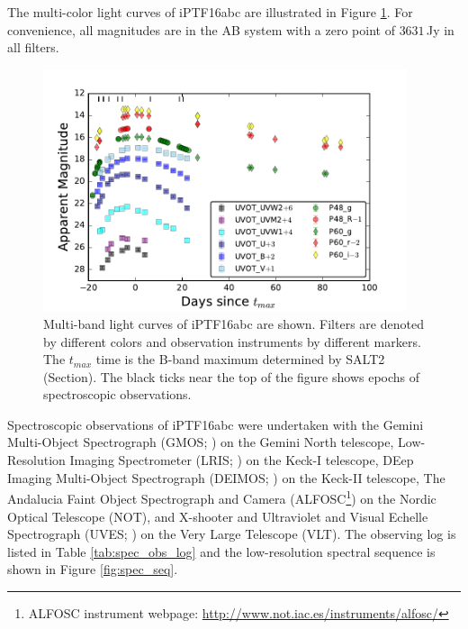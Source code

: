 \documentclass[twocolumn]{aastex61}
\begin{document}
The multi-color light curves of iPTF16abc are illustrated in Figure
\ref{fig:lightcurve}.  For convenience, all magnitudes are in the AB
system with a zero point of $3631$\,Jy in all filters.

\begin{figure}[htb]
  \centering
  \includegraphics[width=0.95\textwidth]{lightcurve.pdf}
  \caption{Multi-band light curves of iPTF16abc are shown. Filters are
    denoted by different colors and observation instruments by
    different markers. The $t_{max}$ time is the B-band maximum
    determined by SALT2 (Section). The black ticks near the top of the
    figure shows epochs of spectroscopic observations.}
  \label{fig:lightcurve}
\end{figure}

Spectroscopic observations of iPTF16abc were undertaken with the
Gemini Multi-Object Spectrograph (GMOS; \citealt{2004PASP..116..425H})
on the Gemini North telescope, Low-Resolution Imaging Spectrometer
(LRIS; \citealt{1995PASP..107..375O}) on the Keck-I telescope, DEep
Imaging Multi-Object Spectrograph (DEIMOS;
\citealt{2003SPIE.4841.1657F}) on the Keck-II telescope, The Andalucia
Faint Object Spectrograph and Camera (ALFOSC\footnote{ALFOSC
  instrument webpage:
  \url{http://www.not.iac.es/instruments/alfosc/}}) on the Nordic
Optical Telescope (NOT), and X-shooter \citep{2011A&A...536A.105V} and
Ultraviolet and Visual Echelle Spectrograph (UVES;
\citealt{2000SPIE.4008..534D}) on the Very Large Telescope (VLT). The
observing log is listed in Table \ref{tab:spec_obs_log} and the
low-resolution spectral sequence is shown in Figure
\ref{fig:spec_seq}.
\end{document}

